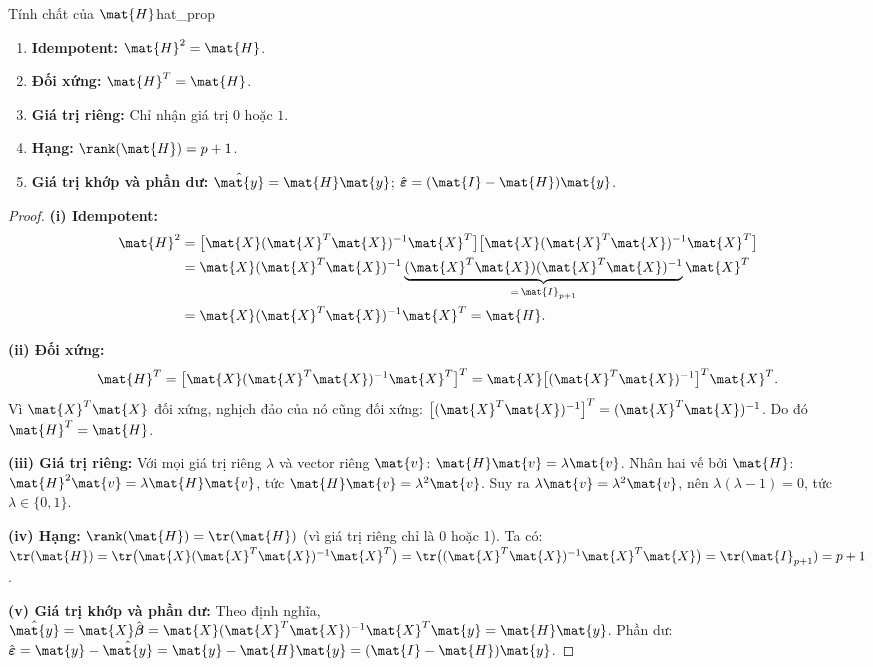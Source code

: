 \begin{myprop}{Tính chất của $\mat{H}$}{hat_prop}~\cite{hoaglin1978}
\begin{enumerate}[label=(\roman*), noitemsep]
    \item \textbf{Idempotent:} $\mat{H}^2 = \mat{H}$.
    \item \textbf{Đối xứng:} $\mat{H}^T = \mat{H}$.
    \item \textbf{Giá trị riêng:} Chỉ nhận giá trị $0$ hoặc $1$.
    \item \textbf{Hạng:} $\rank(\mat{H}) = p + 1$.
    \item \textbf{Giá trị khớp và phần dư:} $\hat{\mat{y}} = \mat{H}\mat{y}$;
          $\hat{\boldsymbol{\varepsilon}} = (\mat{I} - \mat{H})\mat{y}$.
\end{enumerate}
\end{myprop}

\begin{proof}
\textbf{(i) Idempotent:}
\begin{align*}
    \mat{H}^2
    &= \bigl[\mat{X}(\mat{X}^T\mat{X})^{-1}\mat{X}^T\bigr]
       \bigl[\mat{X}(\mat{X}^T\mat{X})^{-1}\mat{X}^T\bigr] \\
    &= \mat{X}(\mat{X}^T\mat{X})^{-1}
       \underbrace{(\mat{X}^T\mat{X})(\mat{X}^T\mat{X})^{-1}}_{=\,\mat{I}_{p+1}}
       \mat{X}^T \\
    &= \mat{X}(\mat{X}^T\mat{X})^{-1}\mat{X}^T = \mat{H}.
\end{align*}

\medskip
\textbf{(ii) Đối xứng:}
\[
    \mat{H}^T
    = \bigl[\mat{X}(\mat{X}^T\mat{X})^{-1}\mat{X}^T\bigr]^T
    = \mat{X}\bigl[(\mat{X}^T\mat{X})^{-1}\bigr]^T\mat{X}^T.
\]
Vì $\mat{X}^T\mat{X}$ đối xứng, nghịch đảo của nó cũng đối xứng:
$\bigl[(\mat{X}^T\mat{X})^{-1}\bigr]^T = (\mat{X}^T\mat{X})^{-1}$.
Do đó $\mat{H}^T = \mat{H}$.

\medskip
\textbf{(iii) Giá trị riêng:} Với mọi giá trị riêng $\lambda$ và vector riêng $\mat{v}$:
$\mat{H}\mat{v} = \lambda\mat{v}$. Nhân hai vế bởi $\mat{H}$:
$\mat{H}^2\mat{v} = \lambda\mat{H}\mat{v}$, tức $\mat{H}\mat{v} = \lambda^2\mat{v}$.
Suy ra $\lambda\mat{v} = \lambda^2\mat{v}$, nên $\lambda(\lambda - 1) = 0$,
tức $\lambda \in \{0, 1\}$.

\medskip
\textbf{(iv) Hạng:} $\rank(\mat{H}) = \tr(\mat{H})$ (vì giá trị riêng chỉ là 0 hoặc 1).
Ta có:
$\tr(\mat{H}) = \tr\bigl(\mat{X}(\mat{X}^T\mat{X})^{-1}\mat{X}^T\bigr)
= \tr\bigl((\mat{X}^T\mat{X})^{-1}\mat{X}^T\mat{X}\bigr) = \tr(\mat{I}_{p+1}) = p+1$.

\medskip
\textbf{(v) Giá trị khớp và phần dư:}
Theo định nghĩa, $\hat{\mat{y}} = \mat{X}\hat{\boldsymbol{\beta}}
= \mat{X}(\mat{X}^T\mat{X})^{-1}\mat{X}^T\mat{y} = \mat{H}\mat{y}$.
Phần dư: $\hat{\boldsymbol{\varepsilon}} = \mat{y} - \hat{\mat{y}}
= \mat{y} - \mat{H}\mat{y} = (\mat{I} - \mat{H})\mat{y}$.
\end{proof}

